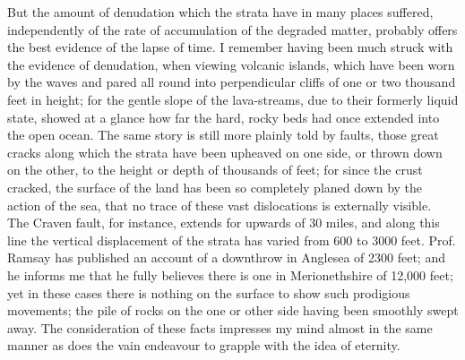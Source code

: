 \indent But the amount of denudation which the strata have in many places suffered, independently of the rate of accumulation of the degraded matter, probably offers the best evidence of the lapse of time. I remember having been much struck with the evidence of denudation, when viewing volcanic islands, which have been worn by the waves and pared all round into perpendicular cliffs of one or two thousand feet in height; for the gentle slope of the lava-streams, due to their formerly liquid state, showed at a glance how far the hard, rocky beds had once extended into the open ocean. The same story is still more plainly told by faults, those great cracks along which the strata have been upheaved on one side, or thrown down on the other, to the height or depth of thousands of feet; for since the crust cracked, the surface of the land has been so completely planed down by the action of the sea, that no trace of these vast dislocations is externally visible.\\
\indent The Craven fault, for instance, extends for upwards of 30 miles, and along this line the vertical displacement of the strata has varied from 600 to 3000 feet. Prof. Ramsay has published an account of a downthrow in Anglesea of 2300 feet; and he informs me that he fully believes there is one in Merionethshire of 12,000 feet; yet in these cases there is nothing on the surface to show such prodigious movements; the pile of rocks on the one or other side having been smoothly swept away. The consideration of these facts impresses my mind almost in the same manner as does the vain endeavour to grapple with the idea of eternity.\\
